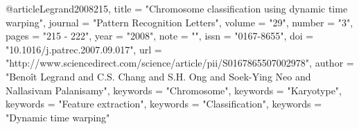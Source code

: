 @article{Legrand2008215,
title = "Chromosome classification using dynamic time warping",
journal = "Pattern Recognition Letters",
volume = "29",
number = "3",
pages = "215 - 222",
year = "2008",
note = "",
issn = "0167-8655",
doi = "10.1016/j.patrec.2007.09.017",
url = "http://www.sciencedirect.com/science/article/pii/S0167865507002978",
author = "Benoît Legrand and C.S. Chang and S.H. Ong and Soek-Ying Neo and Nallasivam Palanisamy",
keywords = "Chromosome",
keywords = "Karyotype",
keywords = "Feature extraction",
keywords = "Classification",
keywords = "Dynamic time warping"
}

